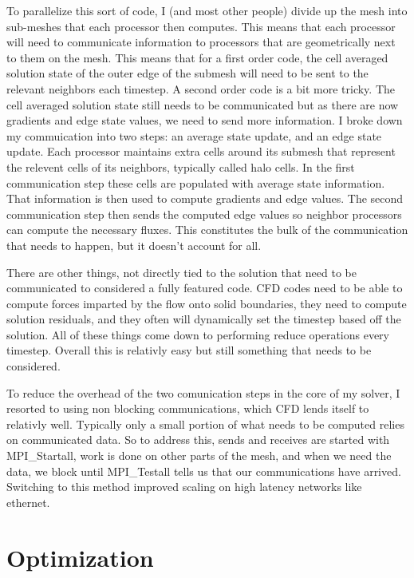 \documentclass[12pt,parskip=full]{article}
\numberwithin{subsection}{section}
\begin{document}
		To parallelize this sort of code, I (and most other people) divide up the mesh into sub-meshes that each processor then computes.
		This means that each processor will need to communicate information to processors that are geometrically next to them on the 
		mesh. This means that for a first order code, the cell averaged solution state of the outer edge of the submesh will need to be
		sent to the relevant neighbors each timestep. A second order code is a bit more tricky. The cell averaged solution state still
		needs to be communicated but as there are now gradients and edge state values, we need to send more information. I broke down my
		commuication into two steps: an average state update, and an edge state update. Each processor maintains extra cells around its
		submesh that represent the relevent cells of its neighbors, typically called halo cells. In the first communication step these
		cells are populated with average state information. That information is then used to compute gradients and edge values. The
		second communication step then sends the computed edge values so neighbor processors can compute the necessary fluxes.
		This constitutes the bulk of the communication that needs to happen, but it doesn't account for all. 

		There are other things, not directly tied to the solution that need to be communicated to considered a fully featured code.
		CFD codes need to be able to compute forces imparted by the flow onto solid boundaries, they need to compute solution residuals,
		and they often will dynamically set the timestep based off the solution. All of these things come down to performing reduce
		operations every timestep. Overall this is relativly easy but still something that needs to be considered.

		To reduce the overhead of the two comunication steps in the core of my solver, I resorted to using non blocking communications,
		which CFD lends itself to relativly well. Typically only a small portion of what needs to be computed relies on communicated data.
		So to address this, sends and receives are started with MPI_Startall, work is done on other parts of the mesh, and when we
		need the data, we block until MPI_Testall tells us that our communications have arrived. Switching to this method improved scaling
		on high latency networks like ethernet.

	\section{Optimization}
\end{document}
